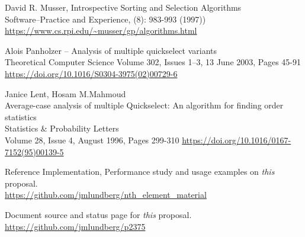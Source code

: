 \begin{thebibliography}{9}
David R. Musser, Introspective Sorting and Selection Algorithms\\
Software--Practice and Experience, (8): 983-993 (1997))\\
\url{https://www.cs.rpi.edu/~musser/gp/algorithms.html }

Alois Panholzer --
Analysis of multiple quickselect variants\\
Theoretical Computer Science
Volume 302, Issues 1–3, 13 June 2003, Pages 45-91\\
\url{https://doi.org/10.1016/S0304-3975(02)00729-6 }

Janice Lent, Hosam M.Mahmoud\\
Average-case analysis of multiple Quickselect: An algorithm for finding order statistics\\
Statistics \& Probability Letters \\
Volume 28, Issue 4, August 1996, Pages 299-310
\url{https://doi.org/10.1016/0167-7152(95)00139-5}


 Reference Implementation, Performance study and usage examples on \emph{this} proposal.\\
\url{https://github.com/jmlundberg/nth_element_material}

Document source and status page for \emph{this} proposal.\\
\url{https://github.com/jmlundberg/p2375}

\end{thebibliography}
\let\addcontentsline\oldaddcontentsline%


